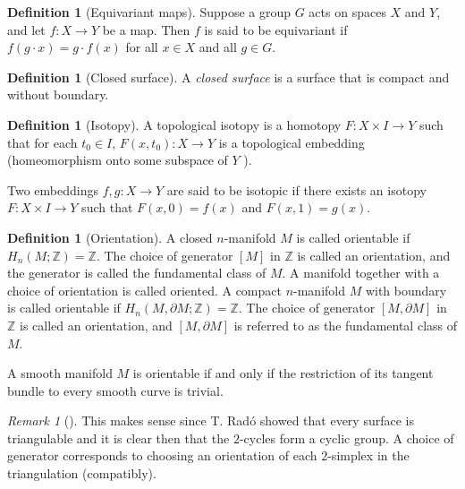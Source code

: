 \documentclass[reqno]{amsart}
\theoremstyle{definition}
\newtheorem{definition}[theorem]{Definition}
\theoremstyle{remark}
\newtheorem*{remark}{Remark}
\begin{document}
\begin{definition}[Equivariant maps]
    Suppose a group $G$ acts on spaces $X$ and $Y$, and let $f \colon X
    \to Y$ be a map. Then  $f$ is said to be equivariant if
    $f (g \cdot x) = g \cdot  f(x)$ for all $x \in X$ and all $g \in G$.
\end{definition}

\begin{definition}[Closed surface]
    A \textit{closed surface} is a surface that is compact
    and without boundary.
\end{definition}

\begin{definition}[Isotopy]
    A topological isotopy is a homotopy
    $F \colon X \times I \to Y$ such that for each $t_0 \in I$,
    $F(x,t_0) \colon X \to Y$ is a topological embedding (homeomorphism onto
    some subspace of $Y$ ).

    Two embeddings $f,g \colon X \to Y$ are said to be
    isotopic if there exists an isotopy $F \colon X \times I
    \to Y$ such that $F(x,0) = f(x)$ and $F(x,1) = g(x)$.
\end{definition}


\begin{definition}[Orientation]
    A closed $n$-manifold $M$ is called orientable
    if $H_n \left( M ; \mathbb{Z} \right) = \mathbb{Z}$.
    The choice of generator $\left[ M \right] $ in
    $\mathbb{Z}$ is called an orientation, and the generator
    is called the fundamental class of $M$. A manifold
    together with a choice of orientation is
    called oriented. A compact $n$-manifold $M$ with
    boundary is called orientable if
    $H_n \left( M, \partial M ; \mathbb{Z} \right) = \mathbb{Z}$.
    The choice of generator $\left[ M, \partial M \right] $ in
    $\mathbb{Z}$ is called an orientation, and
    $\left[ M, \partial M \right] $ is referred to as
    the fundamental class of $M$.

    A smooth manifold $M$ is orientable if and only if
    the restriction of its tangent bundle to every smooth
    curve is trivial.

    \begin{remark}[]
        This makes sense since T. Radó showed that every surface
        is triangulable and it is clear then that the $2$-cycles
        form a cyclic group. A choice of generator corresponds
        to choosing an orientation of each $2$-simplex in the
        triangulation (compatibly).
    \end{remark}
\end{definition}
\end{document}
